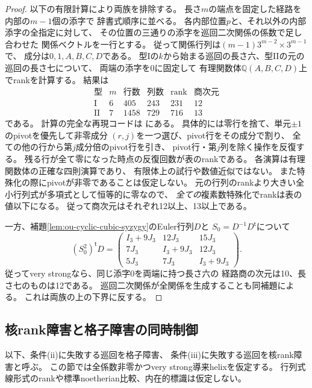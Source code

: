 \begin{proof}
以下の有限計算により両族を排除する。
長さ$m$の端点を固定した経路を内部の$m-1$個の添字で
辞書式順序に並べる。
各内部位置$p$と、それ以外の内部添字の全指定に対して、
その位置の三通りの添字を巡回二次関係の係数で足し合わせた
関係ベクトルを一行とする。
従って関係行列は$(m-1)3^{m-2}\times3^{m-1}$で、
成分は$0,1,A,B,C,D$である。
型Iの$k$から始まる巡回の長さ六、型IIの元の巡回の長さ七について、
両端の添字を0に固定して
有理関数体$\mathbb Q(A,B,C,D)$上でrankを計算する。
結果は
\[
\begin{array}{c|r|r|r|r|r}
\text{型}&m&\text{行数}&\text{列数}&\text{rank}&
\text{商次元}\\ \hline
\mathrm{I}&6&405&243&231&12\\
\mathrm{II}&7&1458&729&716&13
\end{array}
\]
である。
計算の完全な再現コードは
にある。
具体的には零行を捨て、単元$\pm1$のpivotを優先して非零成分
$(r,j)$を一つ選び、pivot行をその成分で割り、
全ての他の行から第$j$成分倍のpivot行を引き、
pivot行・第$j$列を除く操作を反復する。
残る行が全て零になった時点の反復回数が表のrankである。
各演算は有理関数体の正確な四則演算であり、
有限体上の試行や数値近似ではない。
また特殊化の際にpivotが非零であることは仮定しない。
元の行列のrankより大きい全小行列式が多項式として恒等的に零なので、
\emph{全ての}複素数特殊化でrankは表の値以下になる。
従って商次元はそれぞれ12以上、13以上である。

一方、補題\ref{lem:ou-cyclic-cubic-syzygy}のEuler行列$D$と
$S_0=D^{-1}D^{\mathsf t}$について
\[
 (S_0^2)^{\mathsf t}D=
 \begin{pmatrix}
 I_3+9J_3&12J_3&15J_3\\
 7J_3&I_3+9J_3&12J_3\\
 5J_3&7J_3&I_3+9J_3
 \end{pmatrix}.
\]
従ってvery strongなら、同じ添字0を両端に持つ長さ六の
経路商の次元は10、長さ七のものは12である。
巡回二次関係が全関係を生成することも同補題による。
これは両族の上の下界に反する。
\end{proof}

\subsection{核rank障害と格子障害の同時制御}
\label{subsec:ou-dense-mixed-obstructions}

以下、条件(ii)に失敗する巡回を格子障害、
条件(iii)に失敗する巡回を核rank障害と呼ぶ。
この節では全係数非零かつvery strong導来helixを仮定する。
行列式線形式のrankや標準noetherian比較、内在的標識は仮定しない。

